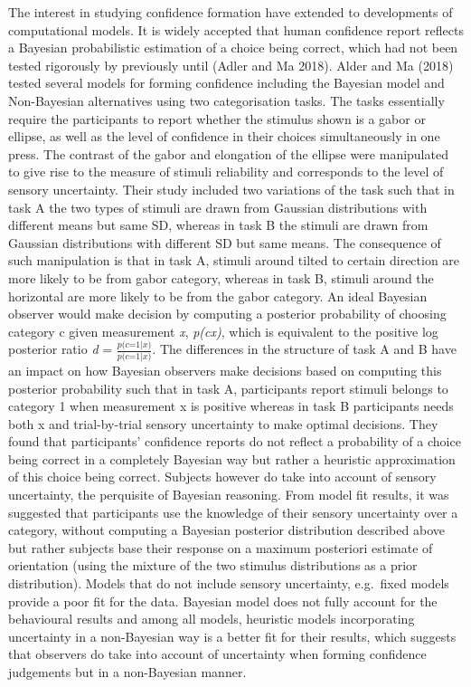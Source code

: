 \documentclass[]{article}
\begin{document}
The interest in studying confidence formation have extended to
developments of computational models. It is widely accepted that human
confidence report reflects a Bayesian probabilistic estimation of a
choice being correct, which had not been tested rigorously by previously
until (Adler and Ma 2018). Alder and Ma (2018) tested several models for
forming confidence including the Bayesian model and Non-Bayesian
alternatives using two categorisation tasks. The tasks essentially
require the participants to report whether the stimulus shown is a gabor
or ellipse, as well as the level of confidence in their choices
simultaneously in one press. The contrast of the gabor and elongation of
the ellipse were manipulated to give rise to the measure of stimuli
reliability and corresponds to the level of sensory uncertainty. Their
study included two variations of the task such that in task A the two
types of stimuli are drawn from Gaussian distributions with different
means but same SD, whereas in task B the stimuli are drawn from Gaussian
distributions with different SD but same means. The consequence of such
manipulation is that in task A, stimuli around tilted to certain
direction are more likely to be from gabor category, whereas in task B,
stimuli around the horizontal are more likely to be from the gabor
category. An ideal Bayesian observer would make decision by computing a
posterior probability of choosing category c given measurement \emph{x},
\emph{p(c\textbar{}x)}, which is equivalent to the positive log
posterior ratio \emph{d} =
\(\frac{\textit{p(c=1|x)} }{\textit{p(c=1|x)} }\). The differences in
the structure of task A and B have an impact on how Bayesian observers
make decisions based on computing this posterior probability such that
in task A, participants report stimuli belongs to category 1 when
measurement x is positive whereas in task B participants needs both x
and trial-by-trial sensory uncertainty to make optimal decisions. They
found that participants' confidence reports do not reflect a probability
of a choice being correct in a completely Bayesian way but rather a
heuristic approximation of this choice being correct. Subjects however
do take into account of sensory uncertainty, the perquisite of Bayesian
reasoning. From model fit results, it was suggested that participants
use the knowledge of their sensory uncertainty over a category, without
computing a Bayesian posterior distribution described above but rather
subjects base their response on a maximum posteriori estimate of
orientation (using the mixture of the two stimulus distributions as a
prior distribution). Models that do not include sensory uncertainty,
e.g.~fixed models provide a poor fit for the data. Bayesian model does
not fully account for the behavioural results and among all models,
heuristic models incorporating uncertainty in a non-Bayesian way is a
better fit for their results, which suggests that observers do take into
account of uncertainty when forming confidence judgements but in a
non-Bayesian manner.
\end{document}
